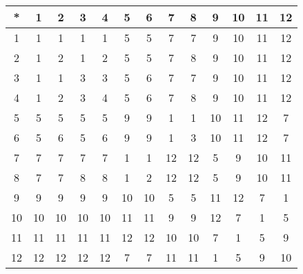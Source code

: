 \begin{tabular}[t]{c|cccccccccccc}
*&1&2&3&4&5&6&7&8&9&10&11&12 \\ \hline
    1&1&1&1&1&5&5&7&7&9&10&11&12 \\
    2&1&2&1&2&5&5&7&8&9&10&11&12 \\
    3&1&1&3&3&5&6&7&7&9&10&11&12 \\
    4&1&2&3&4&5&6&7&8&9&10&11&12 \\
    5&5&5&5&5&9&9&1&1&10&11&12&7 \\
    6&5&6&5&6&9&9&1&3&10&11&12&7 \\
    7&7&7&7&7&1&1&12&12&5&9&10&11 \\
    8&7&7&8&8&1&2&12&12&5&9&10&11 \\
    9&9&9&9&9&10&10&5&5&11&12&7&1 \\
    10&10&10&10&10&11&11&9&9&12&7&1&5 \\
    11&11&11&11&11&12&12&10&10&7&1&5&9 \\
    12&12&12&12&12&7&7&11&11&1&5&9&10 
\end{tabular}


